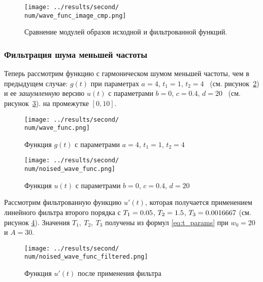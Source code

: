 \begin{figure}[ht!]
    \centering
    \texttt{[image: ../results/second/\\num/wave\_func\_image\_cmp.png]}
    \caption{Сравнение модулей образов исходной и фильтрованной функций.}
    \label{fig:wave_func_image_cmp_\num}
\end{figure}

\FloatBarrier
\subsubsection{Фильтрация шума меньшей частоты}

\def\num{7}
\def\a{4}
\def\from{1}
\def\to{4}
\def\b{0}
\def\c{0.4}
\def\d{20}
\def\L{10}
\def\A{30}
\def\Wz{20}
\def\Tf{\fpeval{round(1 / \Wz, 7)}}
\def\Ts{\fpeval{round(\A / \Wz, 7)}}
\def\Tt{\fpeval{round(1 / (\A * \Wz), 7)}}

Теперь рассмотрим функцию с гармоническом шумом меньшей частоты, чем в предыдущем случае: 
$g(t)$ при параметрах $a=\a$, $t_1 = \from$, $t_2 = \to$ ~(см. рисунок~\ref{fig:wave_func_\num}) 
и ее \textit{зашумленную} версию $u(t)$ с параметрами $b = \b$, $c = \c$, $d = \d$ ~(см. рисунок~\ref{fig:noised_wave_func_\num}).
на промежутке $[0,\L]$. 

\begin{figure}[ht!]
    \centering
    \texttt{[image: ../results/second/\\num/wave\_func.png]}
    \caption{Функция $g(t)$ с параметрами $a = \a$, $t_1 = \from$, $t_2 = \to$}
    \label{fig:wave_func_\num}
\end{figure}

\begin{figure}[ht!]
    \centering
    \texttt{[image: ../results/second/\\num/noised\_wave\_func.png]}
    \caption{Функция $u(t)$ с параметрами $b = \b$, $c = \c$, $d = \d$}
    \label{fig:noised_wave_func_\num}
\end{figure}

Рассмотрим фильтрованную функцию $u'(t)$, которая получается применением линейного фильтра второго порядка с $T_1 = \Tf$, $T_2 = \Ts$, $T_3 = \Tt$ (см. рисунок \ref{fig:noised_wave_func_filtered_\num}).
Значения $T_1,~T_2,~T_3$ получены из формул \eqref{eq:t_params} при $w_0 = \Wz$ и $A = \A$.

\begin{figure}[ht!]
    \centering
    \texttt{[image: ../results/second/\\num/noised\_wave\_func\_filtered.png]}
    \caption{Функция $u'(t)$ после применения фильтра}
    \label{fig:noised_wave_func_filtered_\num}
\end{figure}

